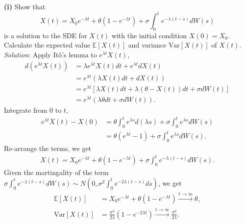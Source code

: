 \documentclass[paper=a4, fontsize=11pt]{scrartcl} %
\numberwithin{equation}{section} %
\numberwithin{figure}{section} %
\numberwithin{table}{section} %
\begin{document}
\textbf{(i)} Show that
$$
X(t) = X_0 e^{-\lambda t} + \theta (1-e^{-\lambda t}) + \sigma\int_0^t e^{-\lambda (t-s)}dW(s)
$$
is a solution to the SDE for $X(t)$ with the initial condition $X(0) = X_0$. Calculate the expected
value $\mathbb{E}[X(t)]$ and variance $\text{Var}[X(t)]$ of $X(t)$.\\
\textit{Solution}: Apply It\^o's lemma to $e^{\lambda t}X(t)$,
\begin{align*}
d\left( e^{\lambda t}X(t) \right) &= \lambda e^{\lambda t}  X(t) dt +  e^{\lambda t} dX(t) \\
&= e^{\lambda t} \left( \lambda X(t)dt + dX(t) \right)\\
&= e^{\lambda t} \left[ \lambda X(t)dt + \lambda\left(\theta - X(t)\right)dt + \sigma dW(t) \right]\\
&= e^{\lambda t} \left( \lambda\theta dt + \sigma dW(t) \right).
\end{align*}
Integrate from $0$ to $t$,
\begin{align*}
e^{\lambda t}X(t) - X(0) &=  \theta \int_0^t e^{\lambda s} d(\lambda s) + \sigma \int_0^t e^{\lambda s}dW(s)\\
& = \theta \left( e^{\lambda t} -1 \right) + \sigma \int_0^t e^{\lambda s}dW(s).
\end{align*}
Re-arrange the terms, we get
\begin{align}\label{xt}
X(t) = X_0 e^{-\lambda t} + \theta \left( 1- e^{-\lambda t} \right) + \sigma \int_0^t e^{-\lambda (t - s)}dW(s).
\end{align}
Given the martingality of the term $\sigma \int_0^t e^{-\lambda (t - s)}dW(s)\sim N\left(0, \sigma^2\int_0^t e^{-2\lambda (t - s)}ds\right)$, we get
\begin{align*}
\mathbb{E}\left[X(t)\right] &= X_0 e^{-\lambda t} + \theta \left( 1- e^{-\lambda t} \right) \xrightarrow[]{t \rightarrow \infty} \theta,\\
\text{Var}\left[X(t)\right] &= \frac{\sigma^2}{2\lambda}\left( 1 - e^{-2\lambda t} \right)\xrightarrow[]{t \rightarrow \infty}  \frac{\sigma^2}{2\lambda}.
\end{align*}\\
\end{document}
